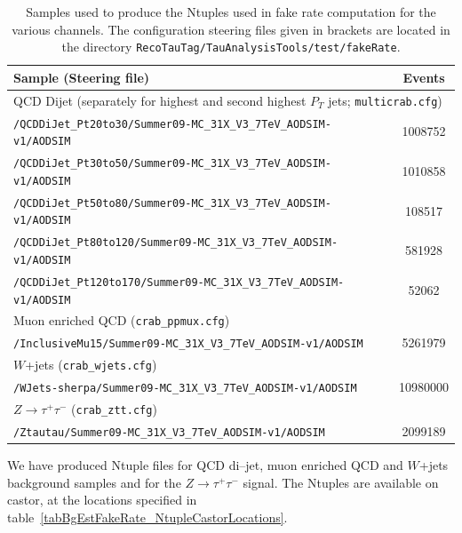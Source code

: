 \begin{table}[t]
\begin{center}
\tablesize
\begin{tabular}{|lc|}
\hline
Sample (Steering file) & Events \\
\hline
\hline
\multicolumn{2}{|l|}{QCD Dijet (separately for highest and second highest $P_{T}$ jets; {\tt multicrab.cfg})} \\
{\tt /QCDDiJet\_Pt20to30/Summer09-MC\_31X\_V3\_7TeV\_AODSIM-v1/AODSIM}   & 1008752 \\
{\tt /QCDDiJet\_Pt30to50/Summer09-MC\_31X\_V3\_7TeV\_AODSIM-v1/AODSIM}   & 1010858 \\
{\tt /QCDDiJet\_Pt50to80/Summer09-MC\_31X\_V3\_7TeV\_AODSIM-v1/AODSIM}   &  108517 \\
{\tt /QCDDiJet\_Pt80to120/Summer09-MC\_31X\_V3\_7TeV\_AODSIM-v1/AODSIM}  &  581928 \\
{\tt /QCDDiJet\_Pt120to170/Summer09-MC\_31X\_V3\_7TeV\_AODSIM-v1/AODSIM} &   52062 \\
\hline
\multicolumn{2}{|l|}{Muon enriched QCD ({\tt crab\_ppmux.cfg})} \\
{\tt /InclusiveMu15/Summer09-MC\_31X\_V3\_7TeV\_AODSIM-v1/AODSIM} & 5261979 \\
\hline
\multicolumn{2}{|l|}{$W$+jets ({\tt crab\_wjets.cfg})} \\
{\tt /WJets-sherpa/Summer09-MC\_31X\_V3\_7TeV\_AODSIM-v1/AODSIM} & 10980000 \\
\hline
\multicolumn{2}{|l|}{$Z \rightarrow \tau^{+}\tau^{-}$ ({\tt crab\_ztt.cfg})} \\
{\tt /Ztautau/Summer09-MC\_31X\_V3\_7TeV\_AODSIM-v1/AODSIM } & 2099189 \\
\hline
\end{tabular}
\end{center}
\begin{center}
\caption{\captiontext Samples used to produce the Ntuples used in fake rate computation for the various channels.  
         The configuration steering files given in brackets are located in the directory 
         {\tt RecoTauTag/TauAnalysisTools/test/fakeRate}.}
\label{tabBgEstFakeRate_NtupleProdCfgFiles}
\end{center}
\end{table}

We have produced Ntuple files for QCD di--jet, muon enriched QCD and $W$+jets background samples
and for the $Z \rightarrow \tau^{+} \tau^{-}$ signal.
The Ntuples are available on castor, at the locations specified in table~\ref{tabBgEstFakeRate_NtupleCastorLocations}.

